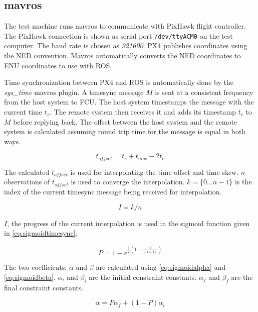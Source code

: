 \subsection{mavros}
The test machine runs mavros to communicate with PixHawk flight controller. 
The PixHawk connection is shown as serial port \texttt{/dev/ttyACM0} on the test computer. The baud rate is chosen as \textit{921600}.
PX4 publishes coordinates using the NED convention. Mavros automatically converts the NED coordinates to ENU coordinates to use with ROS.

Time synchronization between PX4 and ROS is automatically done by the \textit{sys\_time} mavros plugin.
A timesync message $M$ is sent at a consistent frequency from the host system to FCU. The host system timestamps the message with the current time $t_s$. The remote system then receives it and adds its timestamp $t_c$ to $M$ before replying back.
The offset between the host system and the remote system is calculated assuming round trip time for the message is equal in both ways.

\begin{equation}
t_{offset} = t_s + t_{now} - 2t_c
\end{equation}

The calculated $t_{offset}$ is used for interpolating the time offset and time skew. $n$ observations of $t_{offset}$ is used to converge the interpolation. $k = \{0 ... n-1\}$ is the index of the current timesync message being received for interpolation.

\begin{equation}
I = k/n
\end{equation}

$I$, the progress of the current interpolation is used in the sigmoid function given in \ref{eq:sigmoidtimesync}.

\begin{equation} \label{eq:sigmoidtimesync}
P = 1 - e^{\frac{1}{2} (1 - \frac{1}{(1 - I)})}
\end{equation}

The two coefficients, $\alpha$ and $\beta$ are calculated using \ref{eq:sigmoidalpha} and \ref{eq:sigmoidbeta}. $\alpha_i$ and $\beta_i$ are the initial constraint constants. $\alpha_f$ and $\beta_f$ are the final constraint constants.

\begin{equation} \label{eq:sigmoidalpha}
\alpha = P  \alpha_f + (1 - P)  \alpha_i
\end{equation}

